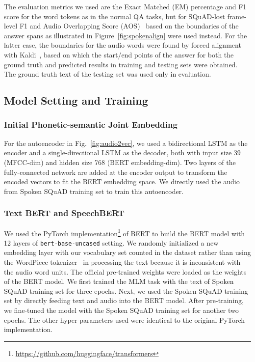 \documentclass[a4paper]{article}
\begin{document}
The evaluation metrics we used are the Exact Matched (EM) percentage and F1 score for the word tokens as in the normal QA tasks, but for SQuAD-lost frame-level F1 and Audio Overlapping Score (AOS)~\cite{Lee2018spoken} based on the boundaries of the answer spans as illustrated in Figure~\ref{fig:spokenalign} were used instead. For the latter case, the boundaries for the audio words were found by forced alignment with Kaldi~\cite{Povey2011}, based on which the start/end points of the answer for both the ground truth and predicted results in training and testing sets were obtained. The ground truth text of the testing set was used only in evaluation.

\vspace{-10pt}
\subsection{Model Setting and Training}
\label{ssec:model}
\vspace{-5pt}

\subsubsection{Initial Phonetic-semantic Joint Embedding}
\label{ssec:expsse}
\vspace{-5pt}

For the autoencoder in Fig.~\ref{fig:audio2vec}, we used a bidirectional LSTM as the encoder and a single-directional LSTM as the decoder, both with input size 39 (MFCC-dim) and hidden size 768 (BERT embedding-dim). Two layers of the fully-connected network are added at the encoder output to transform the encoded vectors to fit the BERT embedding space. We directly used the audio from Spoken SQuAD training set to train this autoencoder.

\vspace{-5pt}
\subsubsection{Text BERT and SpeechBERT}
\label{ssec:expbert}
\vspace{-5pt}

We used the PyTorch implementation\footnote{\label{pytorch}\url{https://github.com/huggingface/transformers}} of BERT to build the BERT model with 12 layers of \texttt{bert-base-uncased} setting. We randomly initialized a new embedding layer with our vocabulary set counted in the dataset rather than using the WordPiece tokenizer~\cite{wu2016} in processing the text because it is inconsistent with the audio word units. The official pre-trained weights were loaded as the weights of the BERT model. We first trained the MLM task with the text of Spoken SQuAD training set for three epochs. 
Next, we used the Spoken SQuAD training set by directly feeding text and audio into the BERT model. 
After pre-training, we fine-tuned the model with the Spoken SQuAD training set for another two epochs. The other hyper-parameters used were identical to the original PyTorch implementation.
 
\end{document}

